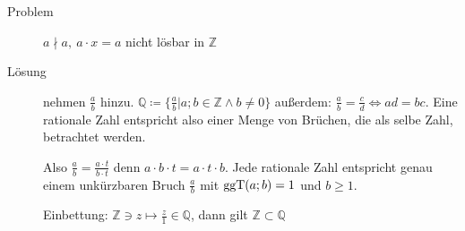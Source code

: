 \begin{description}
    \item[Problem] $a \nmid a,\ a \cdot x = a$ nicht lösbar in $\mathbb{Z}$
    \item[Lösung] nehmen $\frac{a}{b}$ hinzu. $\mathbb{Q} \coloneqq \lbrace \frac{a}{b} | a;b \in \mathbb{Z} \wedge b \not = 0 \rbrace$ außerdem: $\frac{a}{b} = \frac{c}{d} \Leftrightarrow ad = bc$.
    Eine rationale Zahl entspricht also einer Menge von Brüchen, die als selbe Zahl, betrachtet werden.

    Also $\frac{a}{b} = \frac{a \cdot t}{b \cdot t}$ denn $a \cdot b \cdot t = a \cdot t \cdot b$.
    Jede rationale Zahl entspricht genau einem unkürzbaren Bruch $\frac{a}{b}$ mit $\operatorname{ggT}(a;b) = 1$ und $b \geq 1$.

    Einbettung: $\mathbb{Z}\ni z \longmapsto \frac{z}{1} \in \mathbb{Q}$, dann gilt $\mathbb{Z} \subset \mathbb{Q}$


\end{description}
